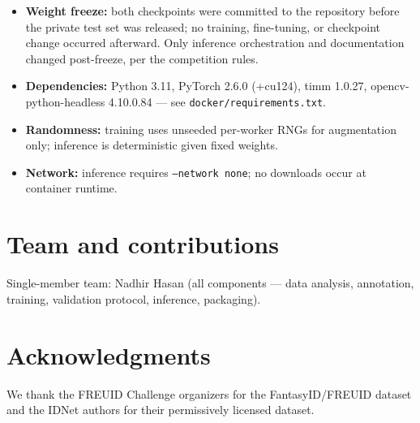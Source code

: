 \documentclass[11pt,a4paper]{article}
\begin{document}
\begin{itemize}[noitemsep]
    (full hashes in \texttt{README.md}). Public-row predictions in these files are
    byte-identical to our pre-code-freeze probes; private rows were predicted
    after the private release using the same frozen weights (inference only).
    Bit-exact float reproduction across differing GPU hardware is not
    guaranteed, rank-identical scores are.
  \item \textbf{Weight freeze:} both checkpoints were committed to the
    repository before the private test set was released; no training,
    fine-tuning, or checkpoint change occurred afterward. Only inference
    orchestration and documentation changed post-freeze, per the competition
    rules.
  \item \textbf{Dependencies:} Python 3.11, PyTorch 2.6.0 (+cu124), timm 1.0.27,
    opencv-python-headless 4.10.0.84 --- see \texttt{docker/requirements.txt}.
  \item \textbf{Randomness:} training uses unseeded per-worker RNGs for
    augmentation only; inference is deterministic given fixed weights.
  \item \textbf{Network:} inference requires \texttt{--network none}; no
    downloads occur at container runtime.
\end{itemize}

\section{Team and contributions}
Single-member team: Nadhir Hasan (all components --- data analysis, annotation,
training, validation protocol, inference, packaging).

\section*{Acknowledgments}
We thank the FREUID Challenge organizers for the FantasyID/FREUID dataset and
the IDNet authors for their permissively licensed dataset.




\appendix
\end{document}
